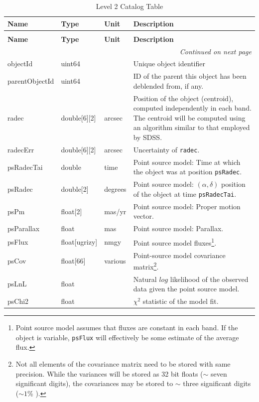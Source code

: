 \documentclass[SE,lsstdraft,toc]{lsstdoc}
\newenvironment{schema}[3]{%
\setlength\LTleft{0pt}
\setlength\LTright{\fill}
\begin{longtable}{p{0.2\textwidth}p{0.14\textwidth}p{0.14\textwidth}p{0.41\textwidth}}

\caption[#1]{#2\label{#3}}\\

\hline \textbf{Name} & \textbf{Type} & \textbf{Unit} & \textbf{Description}\\ \hline
\endfirsthead

\caption[#1]{#2}\\

\hline \textbf{Name} & \textbf{Type} & \textbf{Unit} & \textbf{Description}\\ \hline
\endhead

\hline \multicolumn{4}{r}{\emph{Continued on next page}} \\
\endfoot

\hline\hline
\endlastfoot
}{%
\hline
\end{longtable}
}
\begin{document}
\begin{schema}{\Object Table}{Level 2 Catalog \Object Table}{tbl:objectTable}


objectId & uint64 & ~ & Unique object identifier \\

parentObjectId & uint64 & ~ & ID of the parent \Object this object has been deblended from, if any. \\

radec & double[6][2] & arcsec & Position of the object (centroid), computed independently in each band.
The centroid will be computed using an algorithm similar to that employed by SDSS.\\

radecErr & double[6][2] & arcsec & Uncertainty of \texttt{radec}. \\

psRadecTai & double & time & Point source model: Time at which the object was at position \texttt{psRadec}. \\

psRadec & double[2] & degrees & Point source model: $(\alpha, \delta)$ position of the object at time \texttt{psRadecTai}. \\

psPm & float[2] & mas/yr & Point source model: Proper motion vector.\\

psParallax & float & mas & Point source model: Parallax. \\

psFlux & float[ugrizy] & nmgy & Point source model fluxes\footnote{Point source model assumes that fluxes are constant in each band. If the object is variable, \texttt{psFlux} will effectively be some estimate of the average flux.}.\\

psCov & float[66] & various & Point-source model covariance matrix\footnote{Not all elements of the covariance matrix need to be stored with same precision. While the variances will be stored as 32 bit floats ($\sim$ seven significant digits), the covariances may be stored to $\sim$ three significant digits ($\sim 1$\% ).}. \\

psLnL & float & ~ & Natural $log$ likelihood of the observed data given the point source model. \\

psChi2 & float & ~ & $\chi^2$ statistic of the model fit. \\


\end{schema}
\end{document}
